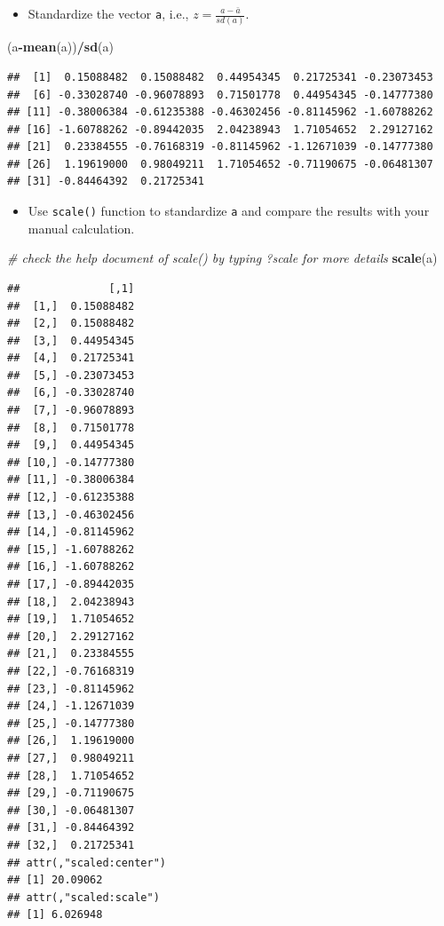 \documentclass[]{book}
\newenvironment{Shaded}{\begin{snugshade}}{\end{snugshade}}
\newcommand{\CommentTok}[1]{\textcolor[rgb]{0.56,0.35,0.01}{\textit{#1}}}
\newcommand{\KeywordTok}[1]{\textcolor[rgb]{0.13,0.29,0.53}{\textbf{#1}}}
\newcommand{\NormalTok}[1]{#1}
\newcommand{\OperatorTok}[1]{\textcolor[rgb]{0.81,0.36,0.00}{\textbf{#1}}}
\providecommand{\tightlist}{%
  \setlength{\itemsep}{0pt}\setlength{\parskip}{0pt}}
\begin{document}
\begin{itemize}
\tightlist
\item
  Standardize the vector \texttt{a}, i.e., \(z = \frac{a-\bar{a}}{sd(a)}\).
\end{itemize}

\begin{Shaded}
\begin{Highlighting}[]
\NormalTok{(a}\OperatorTok{-}\KeywordTok{mean}\NormalTok{(a))}\OperatorTok{/}\KeywordTok{sd}\NormalTok{(a)}
\end{Highlighting}
\end{Shaded}

\begin{verbatim}
##  [1]  0.15088482  0.15088482  0.44954345  0.21725341 -0.23073453
##  [6] -0.33028740 -0.96078893  0.71501778  0.44954345 -0.14777380
## [11] -0.38006384 -0.61235388 -0.46302456 -0.81145962 -1.60788262
## [16] -1.60788262 -0.89442035  2.04238943  1.71054652  2.29127162
## [21]  0.23384555 -0.76168319 -0.81145962 -1.12671039 -0.14777380
## [26]  1.19619000  0.98049211  1.71054652 -0.71190675 -0.06481307
## [31] -0.84464392  0.21725341
\end{verbatim}

\begin{itemize}
\tightlist
\item
  Use \texttt{scale()} function to standardize \texttt{a} and compare the results with your manual calculation.
\end{itemize}

\begin{Shaded}
\begin{Highlighting}[]
\CommentTok{# check the help document of scale() by typing ?scale for more details}
\KeywordTok{scale}\NormalTok{(a)}
\end{Highlighting}
\end{Shaded}

\begin{verbatim}
##              [,1]
##  [1,]  0.15088482
##  [2,]  0.15088482
##  [3,]  0.44954345
##  [4,]  0.21725341
##  [5,] -0.23073453
##  [6,] -0.33028740
##  [7,] -0.96078893
##  [8,]  0.71501778
##  [9,]  0.44954345
## [10,] -0.14777380
## [11,] -0.38006384
## [12,] -0.61235388
## [13,] -0.46302456
## [14,] -0.81145962
## [15,] -1.60788262
## [16,] -1.60788262
## [17,] -0.89442035
## [18,]  2.04238943
## [19,]  1.71054652
## [20,]  2.29127162
## [21,]  0.23384555
## [22,] -0.76168319
## [23,] -0.81145962
## [24,] -1.12671039
## [25,] -0.14777380
## [26,]  1.19619000
## [27,]  0.98049211
## [28,]  1.71054652
## [29,] -0.71190675
## [30,] -0.06481307
## [31,] -0.84464392
## [32,]  0.21725341
## attr(,"scaled:center")
## [1] 20.09062
## attr(,"scaled:scale")
## [1] 6.026948
\end{verbatim}
\end{document}
